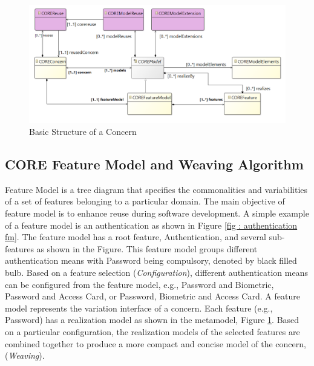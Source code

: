 \begin{figure}
\includegraphics[width=\linewidth]{coremetamodel.PNG}
	\caption{Basic Structure of a Concern}
	\label{fig : core metamodel}
\end{figure}

\subsection{CORE Feature Model and Weaving Algorithm} \label{fm and weaving}
Feature Model is a tree diagram that specifies the commonalities and variabilities of a set of features belonging to a particular domain. The main objective of feature model is to enhance reuse during software development. A simple example of a feature model is an authentication as shown in Figure \ref{fig : authentication fm}. The feature model has a root feature, Authentication, and several sub-features as shown in the Figure. This feature model groups different authentication means with Password being compulsory, denoted by black filled bulb. Based on a feature selection (\textit{Configuration}), different authentication means can be configured from the feature model, e.g., Password and Biometric, Password and Access Card, or Password, Biometric and Access Card. A feature model represents the variation interface of a concern. Each feature (e.g., Password) has a realization model as shown in the metamodel, Figure \ref{fig : core metamodel}. Based on a particular configuration, the realization models of the selected features are combined together to produce a more compact and concise model of the concern, (\textit{Weaving}). 

